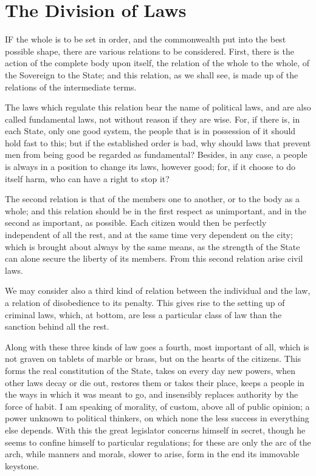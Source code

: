 \documentclass[12pt]{book}
\begin{document}
\section{The Division of Laws}
IF the whole is to be set in order, and the commonwealth put into the best possible shape, there are various relations to be considered. First, there is the action of the complete body upon itself, the relation of the whole to the whole, of the Sovereign to the State; and this relation, as we shall see, is made up of the relations of the intermediate terms.

The laws which regulate this relation bear the name of political laws, and are also called fundamental laws, not without reason if they are wise. For, if there is, in each State, only one good system, the people that is in possession of it should hold fast to this; but if the established order is bad, why should laws that prevent men from being good be regarded as fundamental? Besides, in any case, a people is always in a position to change its laws, however good; for, if it choose to do itself harm, who can have a right to stop it?

The second relation is that of the members one to another, or to the body as a whole; and this relation should be in the first respect as unimportant, and in the second as important, as possible. Each citizen would then be perfectly independent of all the rest, and at the same time very dependent on the city; which is brought about always by the same means, as the strength of the State can alone secure the liberty of its members. From this second relation arise civil laws.

We may consider also a third kind of relation between the individual and the law, a relation of disobedience to its penalty. This gives rise to the setting up of criminal laws, which, at bottom, are less a particular class of law than the sanction behind all the rest.

Along with these three kinds of law goes a fourth, most important of all, which is not graven on tablets of marble or brass, but on the hearts of the citizens. This forms the real constitution of the State, takes on every day new powers, when other laws decay or die out, restores them or takes their place, keeps a people in the ways in which it was meant to go, and insensibly replaces authority by the force of habit. I am speaking of morality, of custom, above all of public opinion; a power unknown to political thinkers, on which none the less success in everything else depends. With this the great legislator concerns himself in secret, though he seems to confine himself to particular regulations; for these are only the arc of the arch, while manners and morals, slower to arise, form in the end its immovable keystone.
\end{document}
